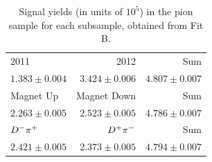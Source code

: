 \begin{table}[htbp]
        \centering
        \caption{Signal yields (in units of $10^{5}$) in the pion sample for each
                subsample, obtained from Fit B.
        \label{tab:splitted_yields}
        }
        \begin{tabular}{lrr}
                \hline
                2011 & 2012 & Sum \\
                $1.383\pm0.004$ & $3.424\pm0.006$ & $4.807\pm0.007$ \\
                \hline
                Magnet Up & Magnet Down & Sum \\
                $2.263\pm0.005$ & $2.523\pm0.005$ & $4.786\pm0.007$ \\
                \hline
                $D^-\pi^+$ & $D^+\pi^-$ & Sum \\
                $2.421\pm0.005$ & $2.373\pm0.005$ & $4.794\pm0.007$ \\
                \hline
        \end{tabular}
\end{table}

